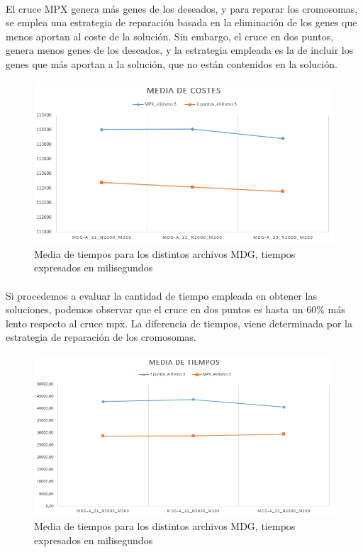 	\paragraph{}El cruce MPX genera más genes de los deseados, y para reparar los cromosomas, se emplea una estrategia de reparación basada en la eliminación de los genes que menos aportan al coste de la solución. Sin embargo, el cruce en dos puntos, genera menos genes de los deseados, y la estrategia empleada es la de incluir los genes que más aportan a la solución, que no están contenidos en la solución.
	
	\begin{figure}[H]
		\centering
		\includegraphics[scale=0.65]{img/MPXvs2Puntos/Costes}
		\caption{Media de tiempos para los distintos archivos MDG, tiempos expresados en milisegundos}
		\label{MDG_MPXvs2Puntos_Costes}
		
	\end{figure}
	
	
	\paragraph{}Si procedemos a evaluar la cantidad de tiempo empleada en obtener las soluciones, podemos observar que el cruce en dos puntos es hasta un 60\% más lento respecto al cruce mpx. La diferencia de tiempos, viene determinada por la estrategia de reparación de los cromosomas.
	
	\begin{figure}[H]
		\centering
		\includegraphics[scale=0.65]{img/MPXvs2Puntos/Tiempos}
		\caption{Media de tiempos para los distintos archivos MDG, tiempos expresados en milisegundos}
		\label{MDG_MPXvs2Puntos_Tiempos}
		
	\end{figure}
	
